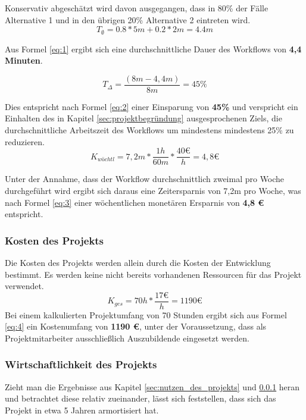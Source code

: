 \documentclass[12pt, xcolor=dvipsnames]{scrartcl}
\begin{document}
Konservativ abgeschätzt wird davon ausgegangen, dass in 80\% der Fälle Alternative 1 und in den übrigen 20\% Alternative 2 eintreten wird.
\begin{equation} \label{eq:1}
	T_\emptyset = 0.8 * 5m + 0.2* 2m = 4.4m
\end{equation}

Aus Formel \ref{eq:1} ergibt sich eine durchschnittliche Dauer des Workflows von \textbf{4,4 Minuten}.



\begin{equation} \label{eq:2}
	T_\Delta = \frac{(8m-4,4m)}{8m} = 45\%
\end{equation}

Dies entspricht nach Formel \ref{eq:2} einer Einsparung von \textbf{45\%} und verspricht ein Einhalten des in Kapitel \ref{sec:projektbegründung} ausgesprochenen Ziels, die durchschnittliche Arbeitszeit des Workflows um mindestens mindestens 25\% zu reduzieren. \\

\begin{equation} \label{eq:3}
	K_{wöchtl} = 7,2m * \frac{1h}{60m} * \frac{40 \euro}{h} = 4,8 \euro
\end{equation}

Unter der Annahme, dass der Workflow durchschnittlich zweimal pro Woche durchgeführt wird ergibt sich daraus eine Zeitersparnis von 7,2m pro Woche, was nach Formel \ref{eq:3} einer wöchentlichen monetären Ersparnis von \textbf{4,8 \euro{}} entspricht.


\subsubsection{Kosten des Projekts}
\label{sec:kosten_des_projekts}

Die Kosten des Projekts werden allein durch die Kosten der Entwicklung bestimmt. Es werden keine nicht bereits vorhandenen Ressourcen für das Projekt verwendet.
\begin{equation} \label{eq:4}
	K_{ges} = 70h * \frac{17 \euro}{h} = 1190 \euro
\end{equation}
Bei einem kalkulierten Projektumfang von 70 Stunden ergibt sich aus Formel \ref{eq:4} ein Kostenumfang von \textbf{1190 \euro{}}, unter der Voraussetzung, dass als Projektmitarbeiter ausschließlich Auszubildende eingesetzt werden.


\subsubsection{Wirtschaftlichkeit des Projekts}
Zieht man die Ergebnisse aus Kapitel \ref{sec:nutzen_des_projekts} und \ref{sec:kosten_des_projekts} heran und betrachtet diese relativ zueinander, lässt sich feststellen, dass sich das Projekt in etwa 5 Jahren armortisiert hat.
\end{document}
